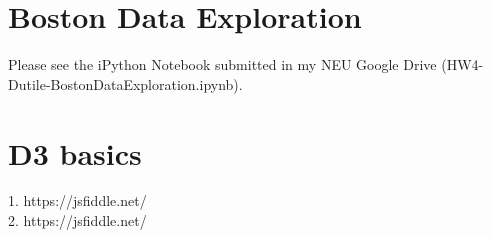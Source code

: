 \documentclass{neu_handout}
\begin{document}
\section*{Boston Data Exploration}

Please see the iPython Notebook submitted in my NEU Google Drive (HW4-Dutile-BostonDataExploration.ipynb).

\section*{D3 basics}

1. https://jsfiddle.net/ \\

2. https://jsfiddle.net/
\end{document}
